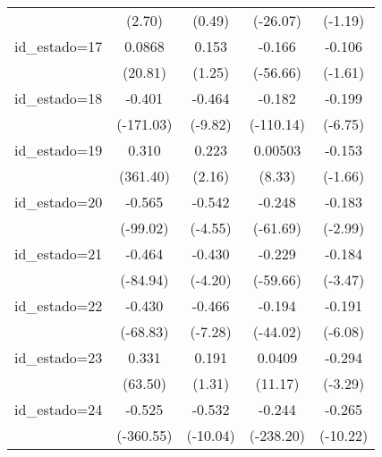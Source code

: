 {\begin{tabular}{l*{4}{c}}
                    &      (2.70)         &      (0.49)         &    (-26.07)         &     (-1.19)         \\
[1em]
id\_estado=17        &      0.0868\sym{***}&       0.153         &      -0.166\sym{***}&      -0.106         \\
                    &     (20.81)         &      (1.25)         &    (-56.66)         &     (-1.61)         \\
[1em]
id\_estado=18        &      -0.401\sym{***}&      -0.464\sym{***}&      -0.182\sym{***}&      -0.199\sym{***}\\
                    &   (-171.03)         &     (-9.82)         &   (-110.14)         &     (-6.75)         \\
[1em]
id\_estado=19        &       0.310\sym{***}&       0.223\sym{*}  &     0.00503\sym{***}&      -0.153         \\
                    &    (361.40)         &      (2.16)         &      (8.33)         &     (-1.66)         \\
[1em]
id\_estado=20        &      -0.565\sym{***}&      -0.542\sym{***}&      -0.248\sym{***}&      -0.183\sym{**} \\
                    &    (-99.02)         &     (-4.55)         &    (-61.69)         &     (-2.99)         \\
[1em]
id\_estado=21        &      -0.464\sym{***}&      -0.430\sym{***}&      -0.229\sym{***}&      -0.184\sym{**} \\
                    &    (-84.94)         &     (-4.20)         &    (-59.66)         &     (-3.47)         \\
[1em]
id\_estado=22        &      -0.430\sym{***}&      -0.466\sym{***}&      -0.194\sym{***}&      -0.191\sym{***}\\
                    &    (-68.83)         &     (-7.28)         &    (-44.02)         &     (-6.08)         \\
[1em]
id\_estado=23        &       0.331\sym{***}&       0.191         &      0.0409\sym{***}&      -0.294\sym{**} \\
                    &     (63.50)         &      (1.31)         &     (11.17)         &     (-3.29)         \\
[1em]
id\_estado=24        &      -0.525\sym{***}&      -0.532\sym{***}&      -0.244\sym{***}&      -0.265\sym{***}\\
                    &   (-360.55)         &    (-10.04)         &   (-238.20)         &    (-10.22)         \\

\end{tabular}}
